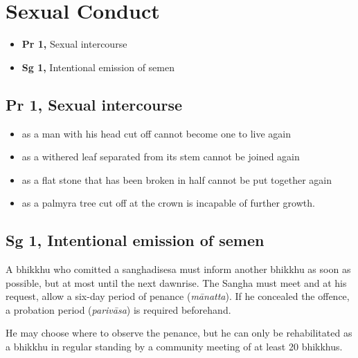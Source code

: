 \chapter{Sexual Conduct}

\begin{itemize}
\tightlist
\item
  \textbf{Pr 1,} Sexual intercourse
\item
  \textbf{Sg 1,} Intentional emission of semen
\end{itemize}

\section{Pr 1, Sexual intercourse}


\begin{itemize}
\tightlist
\item
  as a man with his head cut off cannot become one to live again
\item
  as a withered leaf separated from its stem cannot be joined again
\item
  as a flat stone that has been broken in half cannot be put together
  again
\item
  as a palmyra tree cut off at the crown is incapable of further growth.
\end{itemize}

\section{Sg 1, Intentional emission of semen}


A bhikkhu who comitted a sanghadisesa must inform another bhikkhu as
soon as possible, but at most until the next dawnrise. The Sangha must
meet and at his request, allow a six-day period of penance
(\emph{mānatta}). If he concealed the offence, a probation period
(\emph{parivāsa}) is required beforehand.

He may choose where to observe the penance, but he can only be
rehabilitated as a bhikkhu in regular standing by a community meeting of
at least 20 bhikkhus.


